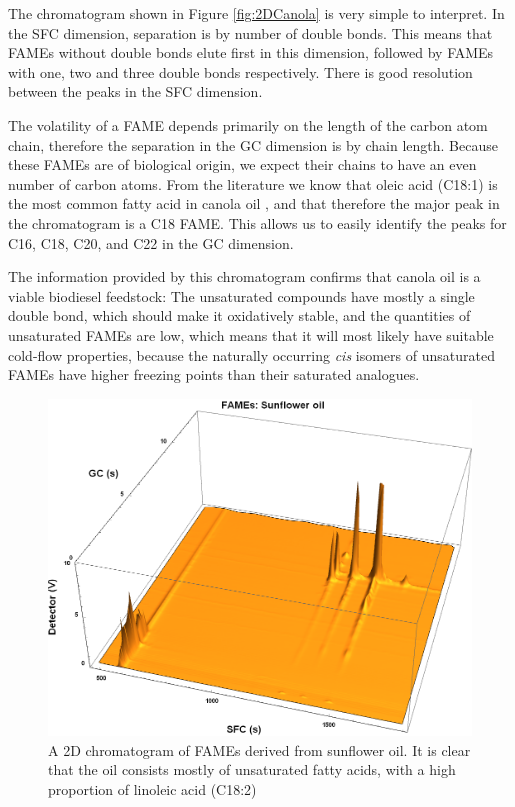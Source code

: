 The chromatogram shown in Figure \ref{fig:2DCanola} is very simple to interpret.
In the SFC dimension, separation is by number of double bonds.
This means that FAMEs without double bonds elute first in this dimension,
followed by FAMEs with one, two and three double bonds respectively. There is
good resolution between the peaks in the SFC dimension.

The volatility of a FAME depends primarily on the length of the carbon atom
chain, therefore the separation in the GC dimension is by chain length. Because
these FAMEs are of biological origin, we expect their chains to have an even
number of carbon atoms. From the literature we know that oleic acid (C18:1) is
the most common fatty acid in canola oil \autocite{JFAOWHOCAC2019}, and that
therefore the major peak in the chromatogram is a C18 FAME. This allows us to
easily identify the peaks for C16, C18, C20, and C22 in the GC dimension.

The information provided by this chromatogram confirms that canola oil is a
vi\-able bio\-diesel feedstock: The unsaturated compounds have mostly a single
double bond, which should make it oxidatively stable, and the quantities of
unsaturated FAMEs are low, which means that it will most likely have suitable
cold-flow properties, because the naturally occurring \textit{cis} isomers of
unsaturated FAMEs have higher freezing points than their saturated analogues.

\begin{figure}
\centering
\includegraphics[width=\textwidth]{Figures/Sunflower.png}
\decoRule

\caption[SFC×GC of sunflower oil]{A 2D chromatogram of FAMEs derived from
sunflower oil. It is clear that the oil consists mostly of unsaturated fatty
acids, with a high proportion of linoleic acid (C18:2)}

\label{fig:2DSunflower}
\end{figure}

